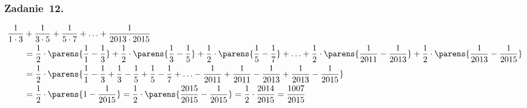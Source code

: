 \subsubsection*{Zadanie~12.}
\begin{equation*}
    \begin{split}
        \frac{1}{1 \cdot 3} &+ \frac{1}{3 \cdot 5} + \frac{1}{5 \cdot 7} + \ldots + \frac{1}{2013 \cdot 2015}\\
            &= \frac{1}{2} \cdot \parens{\frac{1}{1} - \frac{1}{3}} + \frac{1}{2} \cdot \parens{\frac{1}{3} - \frac{1}{5}} + \frac{1}{2} \cdot \parens{\frac{1}{5} - \frac{1}{7}} + \ldots + \frac{1}{2} \cdot \parens{\frac{1}{2011} - \frac{1}{2013}} + \frac{1}{2} \cdot \parens{\frac{1}{2013} - \frac{1}{2015}}\\
            &= \frac{1}{2} \cdot \parens{\frac{1}{1} - \frac{1}{3} + \frac{1}{3} - \frac{1}{5} + \frac{1}{5} - \frac{1}{7} + \ldots - \frac{1}{2011} + \frac{1}{2011} - \frac{1}{2013} + \frac{1}{2013} - \frac{1}{2015}}\\
            &= \frac{1}{2} \cdot \parens{1 - \frac{1}{2015}}
            = \frac{1}{2} \cdot \parens{\frac{2015}{2015} - \frac{1}{2015}}
            = \frac{1}{2} \cdot \frac{2014}{2015}
            = \frac{1007}{2015}
    \end{split}
\end{equation*}
